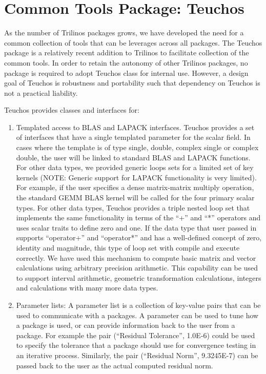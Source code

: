 \documentclass[12pt,relax]{TrilinosOverview}
\begin{document}
\section{Common Tools Package: Teuchos}

As the number of Trilinos packages grows, we have developed the need
for a common collection of tools that can be leverages across all
packages.  The Teuchos package is a relatively recent addition to
Trilinos to facilitate collection of the common tools.  In order to
retain the autonomy of other Trilinos packages, no package is required
to adopt Teuchos class for internal use.  However, a design goal of
Teuchos is robustness and portability such that dependency on Teuchos
is not a practical liability.

Teuchos provides classes and interfaces for:
\begin{enumerate}
\item Templated access to BLAS and LAPACK interfaces.  Teuchos
provides a set of interfaces that
have a single templated parameter for the scalar field.  In cases
where the template is of type single, double, complex single or
complex double, the user will be linked to standard BLAS and LAPACK
functions.  For other data types, we provided generic loops sets for a
limited set of key kernels (NOTE: Generic support for LAPACK
functionality is very limited).  For example, if the user specifies a
dense matrix-matrix multiply operation, the standard GEMM BLAS kernel
will be called for the four primary scalar types.  For other data
types, Teuchos provides a triple nested loop set that implements the
same functionality in terms of the ``+'' and ``*'' operators and uses
scalar traits to define zero and one.  If the
data type that user passed in supports ``operator+'' and ``operator*''
and has a well-defined concept of zero, identity and magnitude,
this type of loop set with compile and execute correctly.  We have used this
mechanism to compute basic matrix and vector calculations using
arbitrary precision arithmetic.  This capability can be used to support interval
arithmetic, geometric transformation calculations, integers and
calculations with many more data types.
\item Parameter lists:  A parameter list is a collection of key-value
pairs that can be used to communicate with a packages.  A parameter
can be used to tune how a package is used, or can provide information
back to the user from a package.  For example the pair (``Residual Tolerance'',
1.0E-6) could be used to specify the tolerance that a package should
use for convergence testing in an iterative process.  Similarly, the
pair (``Residual Norm'', 9.3245E-7) can be passed back to the user as
the actual computed residual norm.  


\end{enumerate}
\end{document}
